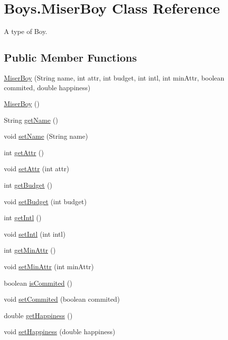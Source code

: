 \hypertarget{class_boys_1_1_miser_boy}{}\section{Boys.\+Miser\+Boy Class Reference}
\label{class_boys_1_1_miser_boy}


A type of Boy.  


\subsection*{Public Member Functions}
\begin{DoxyCompactItemize}
\item 
\hyperlink{class_boys_1_1_miser_boy_a633cc017e9d5a41e6cd4b7fc71a0f3fb}{Miser\+Boy} (String name, int attr, int budget, int intl, int min\+Attr, boolean commited, double happiness)
\item 
\hyperlink{class_boys_1_1_miser_boy_a8b55643f4b48e43867d8171425177c8f}{Miser\+Boy} ()
\item 
String \hyperlink{class_boys_1_1_miser_boy_a3825c28d25ea937404ab62fd5d23c818}{get\+Name} ()
\item 
void \hyperlink{class_boys_1_1_miser_boy_a0d5483f6d82fa631f83474284cedec15}{set\+Name} (String name)
\item 
int \hyperlink{class_boys_1_1_miser_boy_a0d04021ff32c7492e2d789cb97dbea0d}{get\+Attr} ()
\item 
void \hyperlink{class_boys_1_1_miser_boy_afc3c369765c4314d7b8243c759ccbada}{set\+Attr} (int attr)
\item 
int \hyperlink{class_boys_1_1_miser_boy_a28d1393354b3c084e7045f30506853f7}{get\+Budget} ()
\item 
void \hyperlink{class_boys_1_1_miser_boy_a1eb5da28fe63ed53df27499184a8b672}{set\+Budget} (int budget)
\item 
int \hyperlink{class_boys_1_1_miser_boy_ab991f295f7c1ba62a2e5b8a1b799c1a6}{get\+Intl} ()
\item 
void \hyperlink{class_boys_1_1_miser_boy_aaf56ca15493d927c56756b0de0bf440b}{set\+Intl} (int intl)
\item 
int \hyperlink{class_boys_1_1_miser_boy_ac4c79f56ab367f41e37a13d1c5fdfba8}{get\+Min\+Attr} ()
\item 
void \hyperlink{class_boys_1_1_miser_boy_add81a2fadf242cec77df244df2e3b06c}{set\+Min\+Attr} (int min\+Attr)
\item 
boolean \hyperlink{class_boys_1_1_miser_boy_a52710bdca8ae45b713ed00287201a449}{is\+Commited} ()
\item 
void \hyperlink{class_boys_1_1_miser_boy_a0e23e7996f136be4abe259e142d531b6}{set\+Commited} (boolean commited)
\item 
double \hyperlink{class_boys_1_1_miser_boy_adfd0f2fc861f8ba14a04ac2e1c72664b}{get\+Happiness} ()
\item 
void \hyperlink{class_boys_1_1_miser_boy_a1bd22e3a7130262bcd8e14974e2eebcc}{set\+Happiness} (double happiness)
\end{DoxyCompactItemize}
